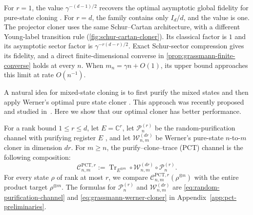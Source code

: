 \documentclass[11pt]{article}
\theoremstyle{remark}
\theoremstyle{plain}
\newcommand{\C}{\mathbb C}
\newcommand{\cC}{\mathcal C}
\newcommand{\Tr}{\operatorname{Tr}}
\newcommand{\ot}{\otimes}
\begin{document}
For \(r=1\), the value \(\gamma^{-(d-1)/2}\) recovers the optimal
asymptotic global fidelity for pure-state cloning \cite{Werner1998}. For
\(r=d\), the family contains only \(I_d/d\), and the value is one.
The projector cloner uses the same Schur--Cartan architecture, with a
different Young-label transition rule (\cref{fig:schur-cartan-cloner}).
Its classical factor is \(1\) and its asymptotic sector factor is
\(\gamma^{-r(d-r)/2}\).  Exact Schur-sector compression gives its fidelity,
and a direct finite-dimensional converse in
\cref{prop:grassmann-finite-converse} holds at every \(n\). When
\(m_n=\gamma n+O(1)\), its upper bound approaches this limit at rate
\(O(n^{-1})\).

A natural idea for mixed-state cloning is to first purify the mixed states and then apply Werner’s optimal pure state cloner \cite{Werner1998}. This approach was recently proposed and studied in~\cite{LiTheilHarrowChuang2026,FanizzaGrinkoScharnhorstSpilecki2026,JeonSohnOh2026}. Here we show that our optimal cloner has better performance.

For a rank bound \(1\le r\le d\), let \(E=\C^r\), let
\(\mathcal P_n^{(r)}\) be the random-purification channel with purifying
register \(E\) \cite{TangWrightZhandry2025,GirardiMeleLami2025}, and let
\(\mathcal W_{n,m}^{(dr)}\) be Werner's pure-state \(n\)-to-\(m\) cloner
in dimension \(dr\).  For \(m\ge n\), the
purify--clone--trace (PCT) channel is the following composition:
\[
  \cC_{n,m}^{\mathrm{PCT},r}
  :=\Tr_{E^{\ot m}}\circ\mathcal W_{n,m}^{(dr)}
    \circ\mathcal P_n^{(r)}.
\]
For every state \(\rho\) of rank at most \(r\), we compare
\(\cC_{n,m}^{\mathrm{PCT},r}(\rho^{\ot n})\) with the entire product target
\(\rho^{\ot m}\).  The formulas for \(\mathcal P_n^{(r)}\) and
\(\mathcal W_{n,m}^{(dr)}\) are \eqref{eq:random-purification-channel} and
\eqref{eq:grassmann-werner-cloner} in Appendix~\ref{app:pct-preliminaries}.
\end{document}
